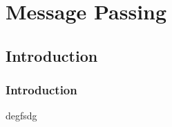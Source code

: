 \documentclass{beamer}
\begin{document}
\section{Message Passing}
\subsection{Introduction}
\begin{frame}
	\frametitle{Introduction}
	degfsdg
\end{frame}
\end{document}
